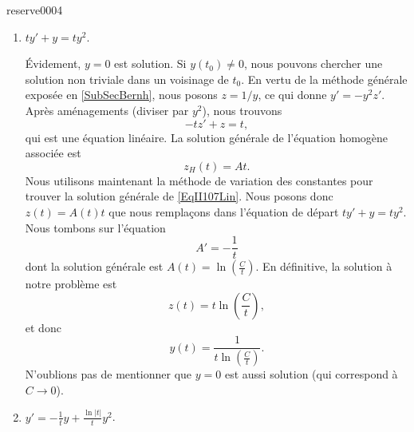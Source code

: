 
\begin{corrige}{reserve0004}

	\begin{enumerate}

		\item
		      $ty'+y=ty^2$.

		      Évidement, $y=0$ est solution. Si $y(t_0)\neq 0$, nous pouvons chercher une solution non triviale dans un voisinage de $t_0$. En vertu de la méthode générale exposée en \ref{SubSecBernh}, nous posons $z=1/y$, ce qui donne $y'=-y^2z'$. Après aménagements (diviser par $y^2$), nous trouvons
		      \begin{equation}		\label{EqII107Lin}
			      -tz'+z=t,
		      \end{equation}
		      qui est une équation linéaire. La solution générale de l'équation homogène associée est
		      \begin{equation}
			      z_H(t)=At.
		      \end{equation}
		      Nous utilisons maintenant la méthode de variation des constantes pour trouver la solution générale de \eqref{EqII107Lin}. Nous posons donc $z(t)=A(t)t$ que nous remplaçons dans l'équation de départ $ty'+y=ty^2$. Nous tombons sur l'équation
		      \begin{equation}
			      A'=-\frac{1}{ t }
		      \end{equation}
		      dont la solution générale est $A(t)=\ln\left( \frac{ C }{ t } \right)$. En définitive, la solution à notre problème est
		      \begin{equation}
			      z(t)=t\ln\left( \frac{ C }{ t } \right),
		      \end{equation}
		      et donc
		      \begin{equation}
			      y(t)=\frac{1}{ t\ln\left( \frac{ C }{ t } \right) }.
		      \end{equation}
		      N'oublions pas de mentionner que $y=0$ est aussi solution (qui correspond à $C\to 0$).

		\item
		      $y'=-\frac{1}{ t }y+\frac{ \ln| t | }{ t }y^2$.


\end{enumerate}
\end{corrige}
